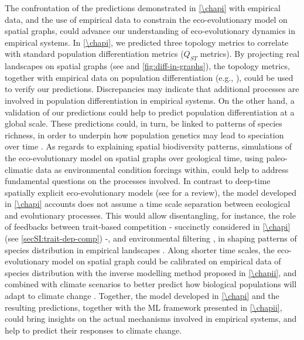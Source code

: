 The confrontation of the predictions demonstrated in \cref{\chapi} with empirical data, and the use of empirical data to constrain the eco-evolutionary model on spatial graphs, could advance our understanding of eco-evolutionary dynamics in empirical systems.
% 
In \cref{\chapi}, we predicted three topology metrics to correlate with standard population differentiation metrics ($Q_{ST}$ metrics). By projecting real landscapes on spatial graphs (see \cite{Dale2010} and \cref{fig:diff-in-graphs}), the topology metrics, together with empirical data on population differentiation (e.g., \citep{Manel2003}), could be used to verify our predictions. Discrepancies may indicate that additional processes are involved in population differentiation in empirical systems. On the other hand, a validation of our predictions could help to predict population differentiation at a global scale. These predictions could, in turn, be linked to patterns of species richness, in order to underpin how population genetics may lead to speciation over time \citep{Templeton1981}.
% 
As regards to explaining spatial biodiversity patterns, simulations of the eco-evolutionary model on spatial graphs over geological time, using paleo-climatic data \citep{STRAUME2020126} as environmental condition forcings within, could help to address fundamental questions on the processes involved. In contrast to deep-time spatially explicit eco-evolutionary models (see \cite{Hagen2022} for a review), the model developed in \cref{\chapi} accounts does not assume a time scale separation between ecological and evolutionary processes.
% 
This would allow disentangling, for instance, the role of feedbacks between trait-based competition \citep{Dieckmann1999} - succinctly considered in \cref{\chapi} (see \cref{secSI:trait-dep-comp}) -, and environmental filtering \citep{Doebeli2003}, in shaping patterns of species distribution in empirical landscapes \cite{Rahbek2019a}. %
% 
Along shorter time scales, the eco-evolutionary model on spatial graph could be calibrated on empirical data of species distribution \cite{Abegg2020,GBIF:TheGlobalBiodiversityInformationFacility2022} with the inverse modelling method proposed in \cref{\chapii}, and combined with climate scenarios \citep{Kriticos2012} to better predict how biological populations will adapt to climate change \citep{Norberg2012,Urban2016}.
% 
Together, the model developed in \cref{\chapi} and the resulting predictions, together with the ML framework presented in \cref{\chapii}, could bring insights on the actual mechanisms involved in empirical systems, and help to predict their responses to climate change. 


